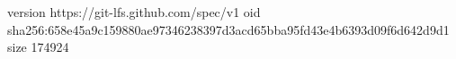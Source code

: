 version https://git-lfs.github.com/spec/v1
oid sha256:658e45a9c159880ae97346238397d3acd65bba95fd43e4b6393d09f6d642d9d1
size 174924
